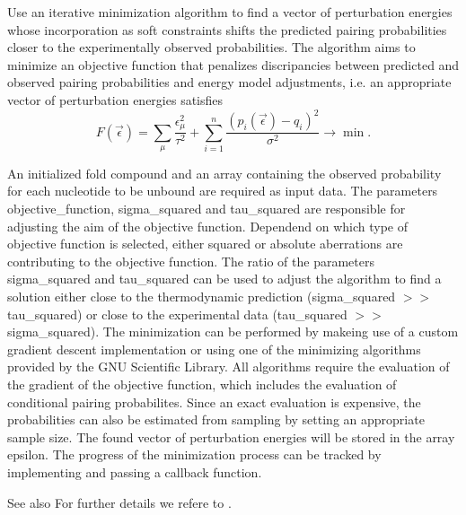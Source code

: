 Use an iterative minimization algorithm to find a vector of perturbation energies whose incorporation as soft constraints shifts the predicted pairing probabilities closer to the experimentally observed probabilities. The algorithm aims to minimize an objective function that penalizes discripancies between predicted and observed pairing probabilities and energy model adjustments, i.\+e. an appropriate vector of perturbation energies satisfies \[ F(\vec\epsilon) = \sum_{\mu}{ \frac{\epsilon_{\mu}^2}{\tau^2} } + \sum_{i = 1}^n{ \frac{(p_i(\vec\epsilon) - q_i)^2}{\sigma^2} } \to \min. \]

An initialized fold compound and an array containing the observed probability for each nucleotide to be unbound are required as input data. The parameters objective\+\_\+function, sigma\+\_\+squared and tau\+\_\+squared are responsible for adjusting the aim of the objective function. Dependend on which type of objective function is selected, either squared or absolute aberrations are contributing to the objective function. The ratio of the parameters sigma\+\_\+squared and tau\+\_\+squared can be used to adjust the algorithm to find a solution either close to the thermodynamic prediction (sigma\+\_\+squared $>$$>$ tau\+\_\+squared) or close to the experimental data (tau\+\_\+squared $>$$>$ sigma\+\_\+squared). The minimization can be performed by makeing use of a custom gradient descent implementation or using one of the minimizing algorithms provided by the G\+NU Scientific Library. All algorithms require the evaluation of the gradient of the objective function, which includes the evaluation of conditional pairing probabilites. Since an exact evaluation is expensive, the probabilities can also be estimated from sampling by setting an appropriate sample size. The found vector of perturbation energies will be stored in the array epsilon. The progress of the minimization process can be tracked by implementing and passing a callback function.

\begin{DoxySeeAlso}{See also}
For further details we refere to \cite{washietl:2012}.
\end{DoxySeeAlso}


